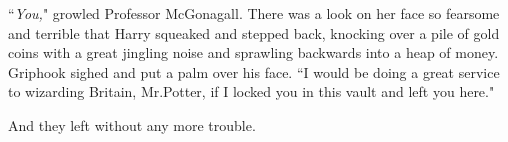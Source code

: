 ``\emph{You,}" growled Professor McGonagall. There was a look on her face so fearsome and terrible that Harry squeaked and stepped back, knocking over a pile of gold coins with a great jingling noise and sprawling backwards into a heap of money. Griphook sighed and put a palm over his face. ``I would be doing a great service to wizarding Britain, Mr.\?Potter, if I locked you in this vault and left you here."

And they left without any more trouble.

